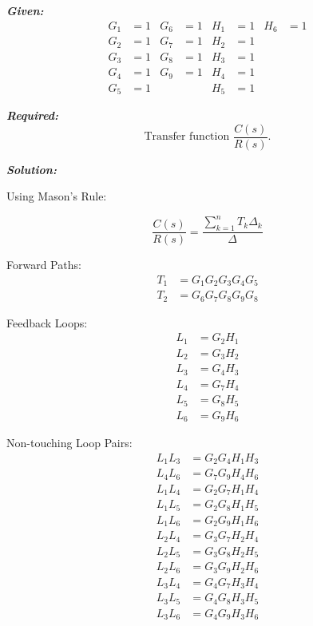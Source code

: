\documentclass[11pt]{article}
\begin{document}
\noindent\textbf{\textit{Given:}}
\[
\begin{aligned}
G_1 &= 1 & G_6 &= 1 & H_1 &= 1 & H_6 &= 1 \\
G_2 &= 1 & G_7 &= 1 & H_2 &= 1 & & \\
G_3 &= 1 & G_8 &= 1 & H_3 &= 1 & & \\
G_4 &= 1 & G_9 &= 1 & H_4 &= 1 & & \\
G_5 &= 1 & & & H_5 &= 1 & & 
\end{aligned}
\]

\vspace{12pt}

\noindent\textbf{\textit{Required:}}
\[
\text{Transfer function } \frac{C(s)}{R(s)}.
\]

\vspace{12pt}

\noindent \textbf{\textit{Solution:}}

\vspace{2pt}
{Using Mason's Rule:}

\[
\frac{C(s)}{R(s)} = \frac{\sum_{k=1}^{n} T_k \Delta_k}{\Delta}
\]

Forward Paths:
\begin{align*}
T_1 &= G_1 G_2 G_3 G_4 G_5 \\
T_2 &= G_6 G_7 G_8 G_9 G_8
\end{align*}

\vspace{0.5em}

Feedback Loops:
\begin{align*}
L_1 &= G_2 H_1 \\
L_2 &= G_3 H_2 \\
L_3 &= G_4 H_3 \\
L_4 &= G_7 H_4 \\
L_5 &= G_8 H_5 \\
L_6 &= G_9 H_6
\end{align*}

\vspace{0.5em}

Non-touching Loop Pairs:
\begin{align*}
L_1 L_3 &= G_2 G_4 H_1 H_3 \\
L_4 L_6 &= G_7 G_9 H_4 H_6 \\
L_1 L_4 &= G_2 G_7 H_1 H_4 \\
L_1 L_5 &= G_2 G_8 H_1 H_5 \\
L_1 L_6 &= G_2 G_9 H_1 H_6 \\
L_2 L_4 &= G_3 G_7 H_2 H_4 \\
L_2 L_5 &= G_3 G_8 H_2 H_5 \\
L_2 L_6 &= G_3 G_9 H_2 H_6 \\
L_3 L_4 &= G_4 G_7 H_3 H_4 \\
L_3 L_5 &= G_4 G_8 H_3 H_5 \\
L_3 L_6 &= G_4 G_9 H_3 H_6
\end{align*}
\end{document}
